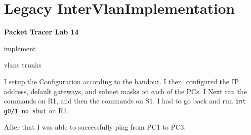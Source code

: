 \documentclass[../EngineeringJournal_CDavis.tex]{subfiles}
\begin{document}

\chapter[Legacy InterVlan Implementation]{Legacy InterVlan\linebreak[1]
Implementation \hspace*{\fill March 5, 2020}}
\noindent\textbf{{Packet Tracer Lab 14} }                             


\hspace{0.2cm}
\begin{tcolorbox}[width=6.3in]
\scriptsize 
implement
  \begin{outline}
    \1 vlans
    \1 trunks
  \end{outline}
\end{tcolorbox}
\hspace{0.2cm}
\normalsize  
  
\clearpage


I setup the Configuration according to the handout. I then, configured the IP
address, default gateways, and subnet masks on each of the PCs.
I Next ran the commands on R1, and then the commands on S1. I had to go back
and run {\scriptsize{\verb$int g0/1 no shut$}\normalsize} on R1.

After that I was able to successfully ping from PC1 to PC3.
\end{document}
